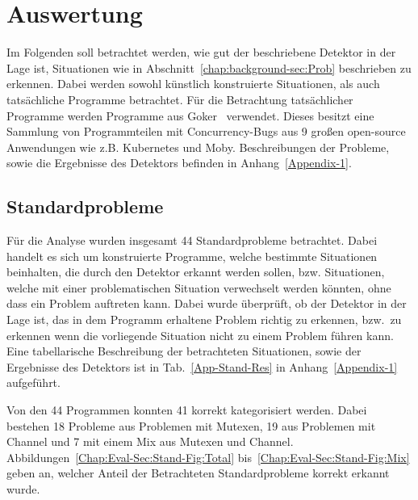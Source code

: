 \chapter{Auswertung}\label{Chap:Eval}
Im Folgenden soll betrachtet werden, wie gut der beschriebene Detektor 
in der Lage ist, Situationen wie in Abschnitt~\ref{chap:background-sec:Prob}
beschrieben zu erkennen. Dabei werden sowohl künstlich konstruierte 
Situationen, als auch tatsächliche Programme betrachtet. Für die Betrachtung 
tatsächlicher Programme werden Programme aus Goker~\cite{gobench}
verwendet. Dieses besitzt eine Sammlung von Programmteilen mit 
Concurrency-Bugs aus 9 
großen open-source Anwendungen wie z.B. Kubernetes und Moby. 
Beschreibungen der Probleme, sowie die Ergebnisse des Detektors befinden in 
Anhang~\ref{Appendix-1}.

\section{Standardprobleme}
Für die Analyse wurden insgesamt 44 Standardprobleme betrachtet. 
Dabei handelt es sich um konstruierte Programme, welche bestimmte 
Situationen beinhalten, die durch den Detektor erkannt werden sollen, 
bzw. Situationen, welche mit einer problematischen Situation verwechselt 
werden könnten, ohne dass ein Problem auftreten kann.  
Dabei wurde überprüft, ob der Detektor in der Lage ist, das in dem 
Programm erhaltene Problem richtig zu erkennen, bzw.~zu erkennen wenn 
die vorliegende Situation nicht zu einem Problem führen kann. Eine 
tabellarische Beschreibung der betrachteten Situationen, sowie der Ergebnisse 
des Detektors ist in Tab.~\ref{App-Stand-Res} in Anhang~\ref{Appendix-1} aufgeführt.

Von den 44 Programmen konnten 41 korrekt kategorisiert werden. Dabei 
bestehen 18 Probleme aus Problemen mit Mutexen,
19 aus Problemen mit Channel und 7 mit einem 
Mix aus Mutexen und Channel. Abbildungen~\ref{Chap:Eval-Sec:Stand-Fig:Total}
bis~\ref{Chap:Eval-Sec:Stand-Fig:Mix} geben an, welcher Anteil der 
Betrachteten Standardprobleme korrekt erkannt wurde.

